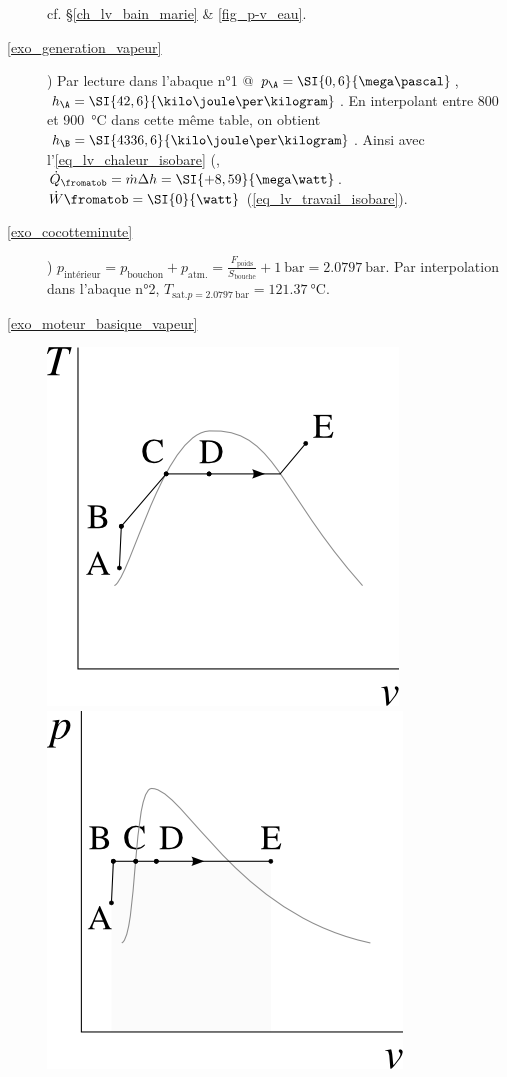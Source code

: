 \begin{description}
			\tab cf. \S\ref{ch_lv_bain_marie} \& \cref{fig_p-v_eau}.
	\item [\ref{exo_generation_vapeur}] 
			) Par lecture dans l’abaque n°1 @ $p_\A = \SI{0,6}{\mega\pascal}$, $h_\A = \SI{42,6}{\kilo\joule\per\kilogram}$. En interpolant entre \num{800} et \SI{900}{\degreeCelsius} dans cette même table, on obtient $h_\B = \SI{4336,6}{\kilo\joule\per\kilogram}$. Ainsi avec l’\cref{eq_lv_chaleur_isobare} (, $\dot{Q}_\fromatob = \dot m \Delta h = \SI{+8,59}{\mega\watt}$. $\dot{W}\fromatob = \SI{0}{\watt}$ (\ref{eq_lv_travail_isobare}).
	\item [\ref{exo_cocotteminute}] 
			) $p_\text{intérieur} = p_\text{bouchon} + p_\text{atm.} = \frac{F_\text{poids}}{S_\text{bouche}} + \SI{1}{\bar} = \SI{2,0797}{\bar}$. Par interpolation dans l’abaque n°2, $T_{\text{sat.} p=\SI{2,0797}{\bar}} = \SI{121,37}{\degreeCelsius}$.
	\item [\ref{exo_moteur_basique_vapeur}]
			\includegraphics[width=\solutiondiagramwidth]{images/ex_tv_moteur_basique_1.png}
			\includegraphics[width=\solutiondiagramwidth]{images/ex_pv_moteur_basique_2.png}

\end{description}
